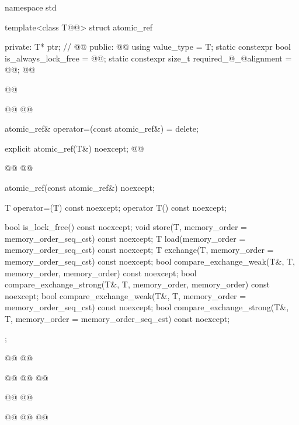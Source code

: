 \begin{codeblock}
namespace std {

  template<class T@@> struct atomic_ref {
  private:
    T* ptr; // \expos
    @@
  public:
    @@
    using value_type = T;
    static constexpr bool is_always_lock_free = @@;
    static constexpr size_t required_@_@alignment = @@;
    @@
    
    @@

    @@
    @@

    atomic_ref& operator=(const atomic_ref&) = delete;

    explicit atomic_ref(T&) noexcept;
    @@
   
    @@
    @@
    
    atomic_ref(const atomic_ref&) noexcept;

    T operator=(T) const noexcept;
    operator T() const noexcept;

    bool is_lock_free() const noexcept;
    void store(T, memory_order = memory_order_seq_cst) const noexcept;
    T load(memory_order = memory_order_seq_cst) const noexcept;
    T exchange(T, memory_order = memory_order_seq_cst) const noexcept;
    bool compare_exchange_weak(T&, T,
                               memory_order, memory_order) const noexcept;
    bool compare_exchange_strong(T&, T,
                                 memory_order, memory_order) const noexcept;
    bool compare_exchange_weak(T&, T,
                               memory_order = memory_order_seq_cst) const noexcept;
    bool compare_exchange_strong(T&, T,
                                 memory_order = memory_order_seq_cst) const noexcept;
  };

  @@
  @@

  @@
  @@
    @@

  @@
  @@

  @@
  @@
    @@
}
\end{codeblock}
~\\


